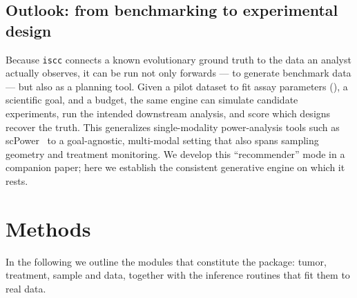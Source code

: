 \documentclass{article}
\begin{document}
\subsection{Outlook: from benchmarking to experimental design}
\label{sec:outlook}
Because \texttt{iscc} connects a known evolutionary ground truth to the data an analyst actually
observes, it can be run not only forwards --- to generate benchmark data --- but also as a planning
tool. Given a pilot dataset to fit assay parameters (), a scientific goal, and a
budget, the same engine can simulate candidate experiments, run the intended downstream analysis,
and score which designs recover the truth. This generalizes single-modality power-analysis tools
such as scPower~\cite{schmid_scpower_2021} to a goal-agnostic, multi-modal setting that also spans
sampling geometry and treatment monitoring. We develop this ``recommender'' mode in a companion
paper; here we establish the consistent generative engine on which it rests.


\section{Methods}
\label{sec:methods}
In the following we outline the modules that constitute the package: tumor, treatment, sample
and data, together with the inference routines that fit them to real data.
\end{document}
